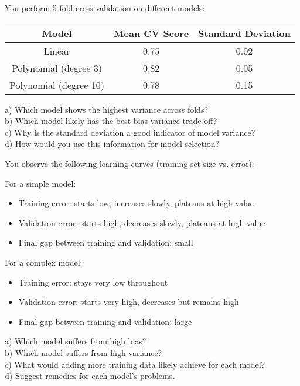 \documentclass{article}
\newcounter{exercise}
\begin{document}
\begin{tcolorbox}[colback=gray!5!white,colframe=gray!75!black,title=Problem \stepcounter{exercise}: Cross-Validation and Model Selection]

You perform 5-fold cross-validation on different models:

\begin{center}
\begin{tabular}{|c|c|c|}
\hline
Model & Mean CV Score & Standard Deviation \\
\hline
Linear & 0.75 & 0.02 \\
Polynomial (degree 3) & 0.82 & 0.05 \\
Polynomial (degree 10) & 0.78 & 0.15 \\
\hline
\end{tabular}
\end{center}

a) Which model shows the highest variance across folds?\\
b) Which model likely has the best bias-variance trade-off?\\
c) Why is the standard deviation a good indicator of model variance?\\
d) How would you use this information for model selection?
\end{tcolorbox}

\begin{tcolorbox}[colback=gray!5!white,colframe=gray!75!black,title=Problem \stepcounter{exercise}: Learning Curves Analysis]

You observe the following learning curves (training set size vs. error):

For a simple model:
\begin{itemize}
    \item Training error: starts low, increases slowly, plateaus at high value
    \item Validation error: starts high, decreases slowly, plateaus at high value
    \item Final gap between training and validation: small
\end{itemize}

For a complex model:
\begin{itemize}
    \item Training error: stays very low throughout
    \item Validation error: starts very high, decreases but remains high
    \item Final gap between training and validation: large
\end{itemize}

a) Which model suffers from high bias?\\
b) Which model suffers from high variance?\\
c) What would adding more training data likely achieve for each model?\\
d) Suggest remedies for each model's problems.
\end{tcolorbox}
\end{document}
